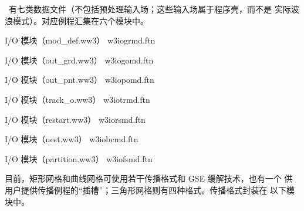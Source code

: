 \noindent
\ws\ 有七类数据文件（不包括预处理输入场；这些输入场属于程序壳，而不是
实际波浪模式）。对应例程汇集在六个模块中。

\vspace{\baselineskip} \noindent
I/O 模块（{\file mod\_def.ww3}） \hfill {\file w3iogrmd.ftn}

\begin{flisti}
\end{flisti}

\noindent
I/O 模块（{\file out\_grd.ww3}） \hfill {\file w3iogomd.ftn}

\begin{flisti}
\end{flisti}

\noindent
I/O 模块（{\file out\_pnt.ww3}） \hfill {\file w3iopomd.ftn}

\begin{flisti}
\end{flisti}

\noindent
I/O 模块（{\file track\_o.ww3}） \hfill {\file w3iotrmd.ftn}

\begin{flisti}
\end{flisti}

\noindent
I/O 模块（{\file restart.ww3}） \hfill {\file w3iorsmd.ftn}

\begin{flisti}
\end{flisti}

\noindent
I/O 模块（{\file nest.ww3}） \hfill {\file w3iobcmd.ftn}

\begin{flisti}
\end{flisti}

\noindent
I/O 模块（{\file partition.ww3}） \hfill {\file w3iofsmd.ftn}

\begin{flisti}
\end{flisti}

\noindent
目前，矩形网格和曲线网格可使用若干传播格式和 GSE 缓解技术，也有一个
供用户提供传播例程的“插槽”；三角形网格则有四种格式。传播格式封装在
以下模块中。

